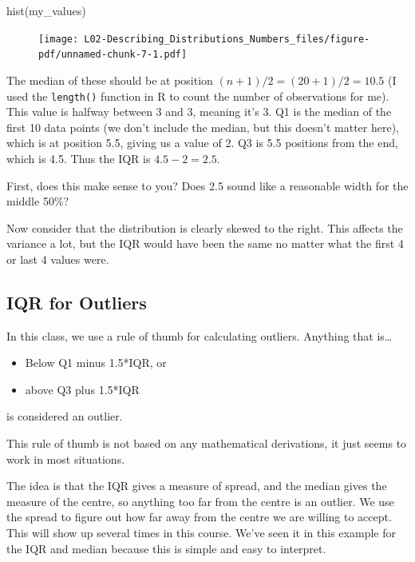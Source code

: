 \documentclass[
  letterpaper,
  DIV=11,
  numbers=noendperiod,
  oneside]{scrreprt}
\newenvironment{Shaded}{\begin{snugshade}}{\end{snugshade}}
\newcommand{\FunctionTok}[1]{\textcolor[rgb]{0.28,0.35,0.67}{#1}}
\newcommand{\NormalTok}[1]{\textcolor[rgb]{0.00,0.23,0.31}{#1}}
\providecommand{\tightlist}{%
  \setlength{\itemsep}{0pt}\setlength{\parskip}{0pt}}\usepackage{longtable,booktabs,array}
\begin{document}
\begin{Shaded}
\begin{Highlighting}[]
\FunctionTok{hist}\NormalTok{(my\_values)}
\end{Highlighting}
\end{Shaded}

\begin{figure}[H]

{\centering \texttt{[image: L02-Describing\_Distributions\_Numbers\_files/figure-pdf/unnamed-chunk-7-1.pdf]}

}

\end{figure}

The median of these should be at position
\((n+1)/2 = (20 + 1)/2 = 10.5\) (I used the \texttt{length()} function
in R to count the number of observations for me). This value is halfway
between 3 and 3, meaning it's 3. Q1 is the median of the first 10 data
points (we don't include the median, but this doesn't matter here),
which is at position 5.5, giving us a value of 2. Q3 is 5.5 positions
from the end, which is 4.5. Thus the IQR is \(4.5 - 2 = 2.5\).

First, does this make sense to you? Does 2.5 sound like a reasonable
width for the middle 50\%?

Now consider that the distribution is clearly skewed to the right. This
affects the variance a lot, but the IQR would have been the same no
matter what the first 4 or last 4 values were.

\hypertarget{iqr-for-outliers}{%
\subsection{IQR for Outliers}\label{iqr-for-outliers}}

In this class, we use a rule of thumb for calculating outliers. Anything
that is\ldots{}

\begin{itemize}
\tightlist
\item
  Below Q1 minus 1.5*IQR, or
\item
  above Q3 plus 1.5*IQR
\end{itemize}

is considered an outlier.

This rule of thumb is not based on any mathematical derivations, it just
seems to work in most situations.

The idea is that the IQR gives a measure of spread, and the median gives
the measure of the centre, so anything too far from the centre is an
outlier. We use the spread to figure out how far away from the centre we
are willing to accept. This will show up several times in this course.
We've seen it in this example for the IQR and median because this is
simple and easy to interpret.
\end{document}
